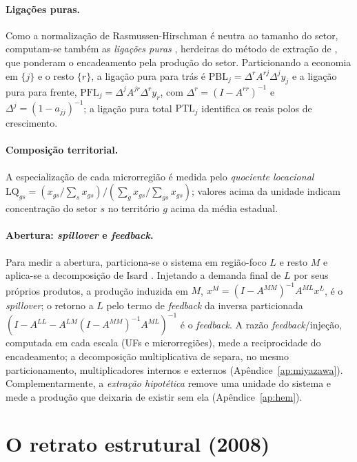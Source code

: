 \documentclass[11pt,a4paper]{article}
\begin{document}
\paragraph{Ligações puras.}
Como a normalização de Rasmussen-Hirschman é neutra ao tamanho do setor, computam-se
também as \emph{ligações puras} \citep{guilhoto2005linkages,millerblair2009}, herdeiras do
método de extração de \citet{cella1984}, que ponderam o encadeamento pela produção do setor. Particionando a economia em
$\{j\}$ e o resto $\{r\}$, a ligação pura para trás é
$\mathrm{PBL}_j=\Delta^{r}A^{rj}\Delta^{j}y_j$ e a ligação pura para frente,
$\mathrm{PFL}_j=\Delta^{j}A^{jr}\Delta^{r}y_r$, com $\Delta^{r}=(I-A^{rr})^{-1}$ e
$\Delta^{j}=(1-a_{jj})^{-1}$; a ligação pura total $\mathrm{PTL}_j$ identifica os reais
polos de crescimento.

\paragraph{Composição territorial.}
A especialização de cada microrregião é medida pelo \emph{quociente locacional}
$\mathrm{LQ}_{gs}=(x_{gs}/\sum_s x_{gs})/(\sum_g x_{gs}/\sum_{gs}x_{gs})$; valores
acima da unidade indicam concentração do setor $s$ no território $g$ acima da média
estadual.

\paragraph{Abertura: \emph{spillover} e \emph{feedback}.}
Para medir a abertura, particiona-se o sistema em região-foco $L$ e resto $M$ e aplica-se
a decomposição de Isard \citep{isard1951,millerblair2009}. Injetando a demanda final de $L$
por seus próprios produtos, a produção induzida em $M$,
$x^{M}=(I-A^{MM})^{-1}A^{ML}x^{L}$, é o \emph{spillover}; o retorno a $L$ pelo termo de
\emph{feedback} da inversa particionada $(I-A^{LL}-A^{LM}(I-A^{MM})^{-1}A^{ML})^{-1}$ é o
\emph{feedback}. A razão \emph{feedback}/injeção, computada em cada escala (UFs e
microrregiões), mede a reciprocidade do encadeamento; a decomposição multiplicativa de
\citet{miyazawa1966} separa, no mesmo particionamento, multiplicadores internos e externos
(Apêndice~\ref{ap:miyazawa}). Complementarmente, a \emph{extração hipotética}
\citep{dietzenbacher1993} remove uma unidade do sistema e mede a produção que deixaria de
existir sem ela (Apêndice~\ref{ap:hem}).

\section{O retrato estrutural (2008)}
\label{sec:retrato}
\end{document}
